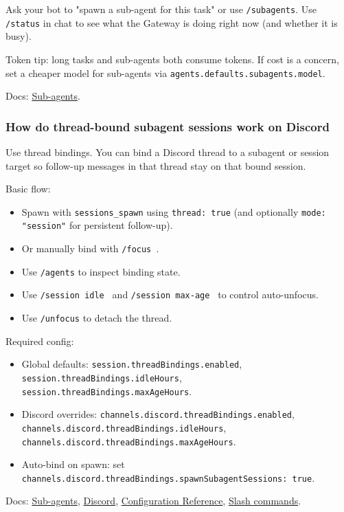 Ask your bot to "spawn a sub-agent for this task" or use \texttt{/subagents}.
Use \texttt{/status} in chat to see what the Gateway is doing right now (and whether it is busy).

Token tip: long tasks and sub-agents both consume tokens. If cost is a concern, set a
cheaper model for sub-agents via \texttt{agents.defaults.subagents.model}.

Docs: \href{/tools/subagents}{Sub-agents}.

\subsubsection{How do thread-bound subagent sessions work on Discord}


Use thread bindings. You can bind a Discord thread to a subagent or session target so follow-up messages in that thread stay on that bound session.

Basic flow:

\begin{itemize}
  \item Spawn with \texttt{sessions\_spawn} using \texttt{thread: true} (and optionally \texttt{mode: "session"} for persistent follow-up).
  \item Or manually bind with \texttt{/focus }.
  \item Use \texttt{/agents} to inspect binding state.
  \item Use \texttt{/session idle } and \texttt{/session max-age } to control auto-unfocus.
  \item Use \texttt{/unfocus} to detach the thread.
\end{itemize}


Required config:

\begin{itemize}
  \item Global defaults: \texttt{session.threadBindings.enabled}, \texttt{session.threadBindings.idleHours}, \texttt{session.threadBindings.maxAgeHours}.
  \item Discord overrides: \texttt{channels.discord.threadBindings.enabled}, \texttt{channels.discord.threadBindings.idleHours}, \texttt{channels.discord.threadBindings.maxAgeHours}.
  \item Auto-bind on spawn: set \texttt{channels.discord.threadBindings.spawnSubagentSessions: true}.
\end{itemize}


Docs: \href{/tools/subagents}{Sub-agents}, \href{/channels/discord}{Discord}, \href{/gateway/configuration-reference}{Configuration Reference}, \href{/tools/slash-commands}{Slash commands}.

